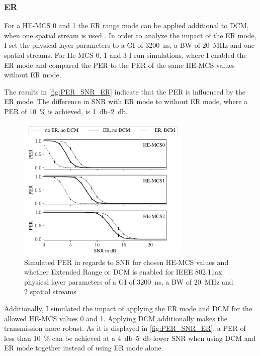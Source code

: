 \subsubsection*{\acf{ER}}
For a HE-MCS \num{0} and \num{1} the \ac{ER} range mode can be applied additional to \ac{DCM}, when one spatial stream is used \cite{noauthor_ieee_2021}.
In order to analyze the impact of the \ac{ER} mode, I set the physical layer parameters to a \ac{GI} of
\SI{3200}{\nano\second}, a \ac{BW} of \SI{20}{\mega\hertz} and one spatial streams.
For He-MCS \num{0}, \num{1} and \num{3} I run simulations, where I enabled the
\ac{ER} mode and compared the \ac{PER} to the \ac{PER} of the same HE-MCS values without \ac{ER} mode.

The results in \autoref{fig:PER_SNR_ER} indicate that the \ac{PER} is influenced by the \ac{ER} mode.
The difference in \ac{SNR} with \ac{ER} mode to without \ac{ER} mode, where a \ac{PER}
of \SI{10}{\percent} is achieved, is \SIrange{1}{2}{\decibel}.

\begin{figure}%
   \centering
   \includegraphics[width=0.74\textwidth]{figures/ER_PER_to_SNR.pdf}
   \caption{Simulated \ac{PER} in regards to \ac{SNR} for chosen HE-\ac{MCS} values and whether Extended Range or \ac{DCM}
   is enabled for IEEE 802.11ax physical layer parameters of a \ac{GI} of \SI{3200}{\nano\second}, a \ac{BW} of \SI{20}{\mega\hertz} and 2 spatial streams}
   \label{fig:PER_SNR_ER}%
\end{figure}

Additionally, I simulated the impact of applying the \ac{ER} mode and \ac{DCM} for the allowed HE-MCS values \num{0} and \num{1}.
Applying \ac{DCM} additionally makes the transmission more robust.
As it is displayed in \autoref{fig:PER_SNR_ER},
a \ac{PER} of less than \SI{10}{\percent} can be achieved at a \SIrange{4}{5}{\decibel} lower \ac{SNR} when using \ac{DCM} and \ac{ER} mode together instead
of using \ac{ER} mode alone.

